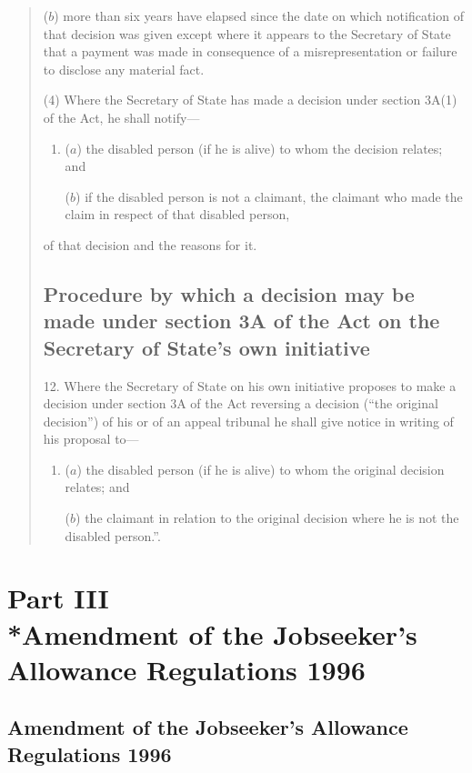 \documentclass[12pt,a4paper]{article}
\begin{document}
\begin{quotation}
\begin{enumerate}
($b$) more than six years have elapsed since the date on which notification of that decision was given except where it appears to the Secretary of State that a payment was made in consequence of a misrepresentation or failure to disclose any material fact.
\end{enumerate}

(4) Where the Secretary of State has made a decision under section 3A(1) of the Act, he shall notify—
\begin{enumerate}\item[]
($a$) the disabled person (if he is alive) to whom the decision relates; and

($b$) if the disabled person is not a claimant, the claimant who made the claim in respect of that disabled person,
\end{enumerate}
of that decision and the reasons for it.

\subsection*{Procedure by which a decision may be made under section 3A of the Act on the Secretary of State’s own initiative}

12.  Where the Secretary of State on his own initiative proposes to make a decision under section 3A of the Act reversing a decision (“the original decision”) of his or of an appeal tribunal he shall give notice in writing of his proposal to—
\begin{enumerate}\item[]
($a$) the disabled person (if he is alive) to whom the original decision relates; and

($b$) the claimant in relation to the original decision where he is not the disabled person.”.
\end{enumerate}
\end{quotation}

\section[Part III --- Amendment of the Jobseeker's Allowance Regulations 1996]{Part III\\*Amendment of the Jobseeker's Allowance Regulations 1996}

\renewcommand\parthead{--- Part III}

\subsection[5. Amendment of the Jobseeker’s Allowance Regulations 1996]{Amendment of the Jobseeker’s Allowance Regulations 1996}
\end{document}
